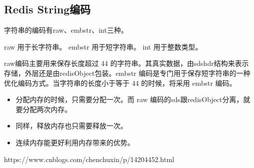 \documentclass[../../../interview-questions.tex]{subfiles}
\begin{document}
\subsection{Redis String编码}

字符串的编码有raw、embstr、int三种。

raw 用于长字符串。
embstr 用于短字符串。
int 用于整数类型。

raw编码主要用来保存长度超过 44 的字符串。其真实数据，由sdshdr结构来表示存储，外层还是由redisObject包装。embstr 编码是专门用于保存短字符串的一种优化编码方式。当字符串的长度小于等于 44 的时候，将采用 embstr 编码。

\begin{itemize}
    \item {分配内存的时候，只需要分配一次。而 raw 编码的sds跟redisObject分离，就要分配两次内存。}
    \item {同样，释放内存也只需要释放一次。}
    \item {连续内存能更好利用内存带来的优势。}
\end{itemize}

https://www.cnblogs.com/chenchuxin/p/14204452.html
\end{document}
